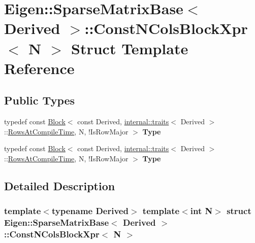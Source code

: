 \hypertarget{struct_eigen_1_1_sparse_matrix_base_1_1_const_n_cols_block_xpr}{}\section{Eigen\+:\+:Sparse\+Matrix\+Base$<$ Derived $>$\+:\+:Const\+N\+Cols\+Block\+Xpr$<$ N $>$ Struct Template Reference}
\label{struct_eigen_1_1_sparse_matrix_base_1_1_const_n_cols_block_xpr}
\subsection*{Public Types}
\begin{DoxyCompactItemize}
\item 
\mbox{\label{struct_eigen_1_1_sparse_matrix_base_1_1_const_n_cols_block_xpr_adcb9a3bdd6eae242d2db0093ae24fc09}} 
typedef const \hyperlink{group___core___module_class_eigen_1_1_block}{Block}$<$ const Derived, \hyperlink{struct_eigen_1_1internal_1_1traits}{internal\+::traits}$<$ Derived $>$\+::\hyperlink{group___sparse_core___module_a726a12d2ba40a5f476c247c8f6db39d9a2f653eb5b8f73f2fafcdd090987c088d}{Rows\+At\+Compile\+Time}, N, !Is\+Row\+Major $>$ {\bfseries Type}
\item 
\mbox{\label{struct_eigen_1_1_sparse_matrix_base_1_1_const_n_cols_block_xpr_adcb9a3bdd6eae242d2db0093ae24fc09}} 
typedef const \hyperlink{group___core___module_class_eigen_1_1_block}{Block}$<$ const Derived, \hyperlink{struct_eigen_1_1internal_1_1traits}{internal\+::traits}$<$ Derived $>$\+::\hyperlink{group___sparse_core___module_a726a12d2ba40a5f476c247c8f6db39d9a2f653eb5b8f73f2fafcdd090987c088d}{Rows\+At\+Compile\+Time}, N, !Is\+Row\+Major $>$ {\bfseries Type}
\end{DoxyCompactItemize}


\subsection{Detailed Description}
\subsubsection*{template$<$typename Derived$>$\newline
template$<$int N$>$\newline
struct Eigen\+::\+Sparse\+Matrix\+Base$<$ Derived $>$\+::\+Const\+N\+Cols\+Block\+Xpr$<$ N $>$}



